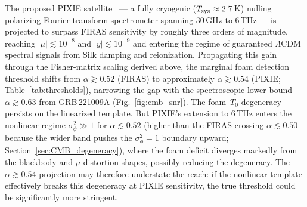 \documentclass[aps,prd,onecolumn,amsmath,amssymb]{revtex4-2}
\begin{document}
The proposed PIXIE satellite~\cite{Kogut2011} --- a fully cryogenic
($T_{\rm sys}\approx2.7$\,K) nulling polarizing Fourier transform spectrometer
spanning $30$\,GHz to $6$\,THz --- is projected to surpass FIRAS sensitivity
by roughly three orders of magnitude, reaching $|\mu|\lesssim10^{-8}$ and
$|y|\lesssim10^{-9}$ and entering the regime of guaranteed $\Lambda$CDM
spectral signals from Silk damping and reionization.
Propagating this gain through the Fisher-matrix scaling derived above,
the marginal foam detection threshold shifts from
$\alpha\gtrsim0.52$ (FIRAS) to approximately $\alpha\gtrsim0.54$
(PIXIE; Table~\ref{tab:thresholds}), narrowing the gap with the
spectroscopic lower bound $\alpha\gtrsim0.63$ from GRB\,221009A
(Fig.~\ref{fig:cmb_snr}).
The foam--$T_0$ degeneracy persists on the linearized template.  But
PIXIE's extension to $6$\,THz enters the nonlinear regime
$\sigma_\phi^2\gg1$ for $\alpha\lesssim0.52$ (higher than the FIRAS
crossing $\alpha\lesssim0.50$ because the wider band pushes the
$\sigma_\phi^2=1$ boundary upward; Section~\ref{sec:CMB_degeneracy}),
where the foam deficit diverges markedly from the blackbody and
$\mu$-distortion shapes, possibly reducing the degeneracy.  The
$\alpha\gtrsim0.54$ projection may therefore understate the reach: if
the nonlinear template effectively breaks this degeneracy at PIXIE
sensitivity, the true threshold could be significantly more stringent.
\end{document}
